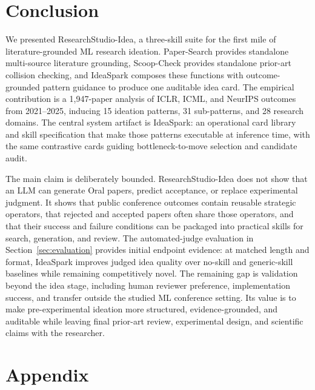 \documentclass[10pt,a4paper]{article}
\begin{document}
\section{Conclusion}
\label{sec:conclusion}

We presented ResearchStudio-Idea, a three-skill suite for the first mile of literature-grounded ML research ideation. Paper-Search provides standalone multi-source literature grounding, Scoop-Check provides standalone prior-art collision checking, and IdeaSpark composes these functions with outcome-grounded pattern guidance to produce one auditable idea card. The empirical contribution is a 1{,}947-paper analysis of ICLR, ICML, and NeurIPS outcomes from 2021--2025, inducing 15 ideation patterns, 31 sub-patterns, and 28 research domains. The central system artifact is IdeaSpark: an operational card library and skill specification that make those patterns executable at inference time, with the same contrastive cards guiding bottleneck-to-move selection and candidate audit.

The main claim is deliberately bounded. ResearchStudio-Idea does not show that an LLM can generate Oral papers, predict acceptance, or replace experimental judgment. It shows that public conference outcomes contain reusable strategic operators, that rejected and accepted papers often share those operators, and that their success and failure conditions can be packaged into practical skills for search, generation, and review. The automated-judge evaluation in Section~\ref{sec:evaluation} provides initial endpoint evidence: at matched length and format, IdeaSpark improves judged idea quality over no-skill and generic-skill baselines while remaining competitively novel. The remaining gap is validation beyond the idea stage, including human reviewer preference, implementation success, and transfer outside the studied ML conference setting. Its value is to make pre-experimental ideation more structured, evidence-grounded, and auditable while leaving final prior-art review, experimental design, and scientific claims with the researcher.

\appendix
\section*{Appendix}



\clearpage

\end{document}
